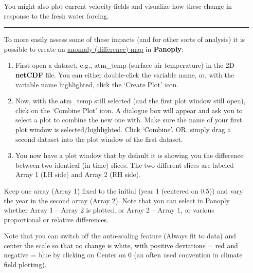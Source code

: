 You might also plot current velocity fields and visualize how these change in response to the fresh water forcing. 

\vspace{1mm}
\noindent\rule{4cm}{0.5pt}
\vspace{2mm}

\newpage

\noindent To more easily assess some of these impacts (and for other sorts of analysis) it is possible to create an \uline{anomaly (difference) map} in \textbf{Panoply}:

\vspace{1mm}
\begin{enumerate}[noitemsep]
\vspace{1mm}
\item  First open a dataset, e.g., \textsf{\footnotesize atm\_temp} (surface air temperature) in the 2D \textbf{netCDF} file. You can either double-click the variable name, or, with the variable name highlighted, click the ‘Create Plot’ icon.
\vspace{1mm}
\item Now, with the \textsf{\footnotesize atm\_temp} still selected (and the first plot window still open), click on the ‘Combine Plot’ icon. A dialogue box will appear and ask you to select a plot to combine the new one with. Make sure the name of your first plot window is selected/highlighted. Click ‘Combine’. OR, simply drag a second dataset into the plot window of the first dataset.
\vspace{1mm}
\item You now have a plot window that by default it is showing you the difference between two identical (in time) slices. The two different slices are labeled Array 1 (LH side) and Array 2 (RH side).
\end{enumerate}
\vspace{1mm}

Keep one array (Array 1) fixed to the initial (year 1 (centered on 0.5)) and vary the year in the second array (Array 2). Note that you can select in Panoply whether Array 1 – Array 2 is plotted, or Array 2 – Array 1, or various proportional or relative differences.

Note that you can switch off the auto-scaling feature (Always fit to data) and center the scale so that no change is white, with positive deviations = red and negative = blue by clicking on Center on 0 (an often used convention in climate field plotting).

